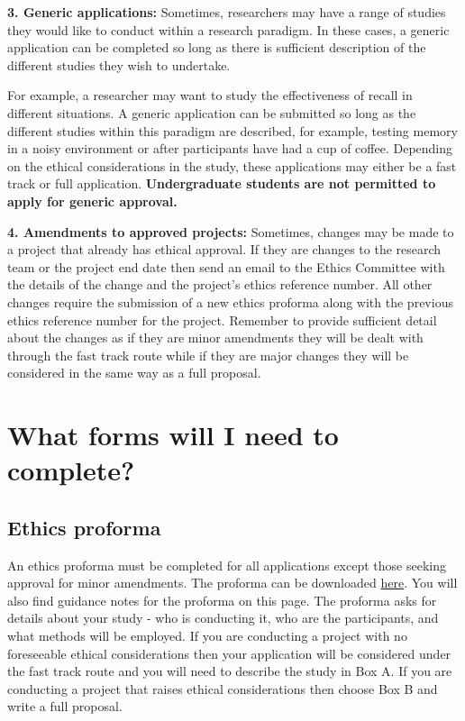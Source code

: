 \documentclass[12pt,]{book}
\theoremstyle{definition}
\theoremstyle{definition}
\theoremstyle{definition}
\theoremstyle{remark}
\begin{document}
\textbf{3. Generic applications:} Sometimes, researchers may have a
range of studies they would like to conduct within a research paradigm.
In these cases, a generic application can be completed so long as there
is sufficient description of the different studies they wish to
undertake.

For example, a researcher may want to study the effectiveness of recall
in different situations. A generic application can be submitted so long
as the different studies within this paradigm are described, for
example, testing memory in a noisy environment or after participants
have had a cup of coffee. Depending on the ethical considerations in the
study, these applications may either be a fast track or full
application. \textbf{Undergraduate students are not permitted to apply
for generic approval.}

\textbf{4. Amendments to approved projects:} Sometimes, changes may be
made to a project that already has ethical approval. If they are changes
to the research team or the project end date then send an email to the
Ethics Committee with the details of the change and the project's ethics
reference number. All other changes require the submission of a new
ethics proforma along with the previous ethics reference number for the
project. Remember to provide sufficient detail about the changes as if
they are minor amendments they will be dealt with through the fast track
route while if they are major changes they will be considered in the
same way as a full proposal.

\section{What forms will I need to
complete?}\label{what-forms-will-i-need-to-complete}

\subsection{Ethics proforma}\label{ethics-proforma}

An ethics proforma must be completed for all applications except those
seeking approval for minor amendments. The proforma can be downloaded
\href{https://inside.psych.cf.ac.uk/}{here}. You will also find guidance
notes for the proforma on this page. The proforma asks for details about
your study - who is conducting it, who are the participants, and what
methods will be employed. If you are conducting a project with no
foreseeable ethical considerations then your application will be
considered under the fast track route and you will need to describe the
study in Box A. If you are conducting a project that raises ethical
considerations then choose Box B and write a full proposal.
\end{document}
